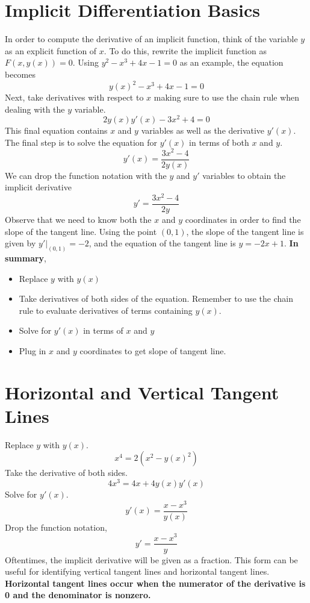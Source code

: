 \documentclass[12pt, letterpaper]{article}
\begin{document}
\section{Implicit Differentiation Basics}
In order to compute the derivative of an implicit function, think of the variable $y$ as an explicit function of $x$. To do this, rewrite the implicit function as $F(x,y(x)) = 0$. Using $y^2-x^3+4x-1 = 0$ as an example, the equation becomes \[y(x)^2-x^3+4x-1=0\] Next, take derivatives with respect to $x$ making sure to use the chain rule when dealing with the $y$ variable. \[2y(x)y'(x)-3x^2+4 = 0\] This final equation contains $x$ and $y$ variables as well as the derivative $y'(x)$. The final step is to solve the equation for $y'(x)$ in terms of both $x$ and $y$. \[y'(x) = \frac{3x^2-4}{2y(x)}\] We can drop the function notation with the $y$ and $y'$ variables to obtain the implicit derivative \[y' = \frac{3x^2-4}{2y}\] Observe that we need to know both the $x$ and $y$ coordinates in order to find the slope of the tangent line. Using the point $(0,1)$, the slope of the tangent line is given by $y'|_{(0,1)} = -2$, and the equation of the tangent line is $y = -2x+1$. \textbf{In summary},
\begin{itemize}
	\item Replace $y$ with $y(x)$
	\item Take derivatives of both sides of the equation. Remember to use the chain rule to evaluate derivatives of terms containing $y(x)$.
	\item Solve for $y'(x)$ in terms of $x$ and $y$
	\item Plug in $x$ and $y$ coordinates to get slope of tangent line.
\end{itemize}

\section{Horizontal and Vertical Tangent Lines}
Replace $y$ with $y(x)$. \[x^4 = 2(x^2-y(x)^2)\] Take the derivative of both sides. \[4x^3 = 4x+4y(x)y'(x)\] Solve for $y'(x)$. \[y'(x) = \frac{x-x^3}{y(x)}\] Drop the function notation, \[y' = \frac{x-x^3}{y}\] Oftentimes, the implicit derivative will be given as a fraction. This form can be useful for identifying vertical tangent lines and horizontal tangent lines. \textbf{Horizontal tangent lines occur when the numerator of the derivative is 0 and the denominator is nonzero.}
\end{document}
